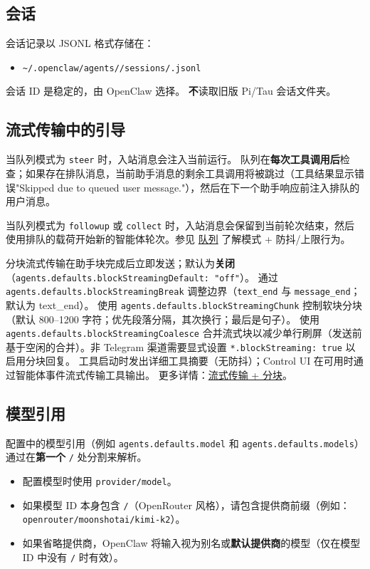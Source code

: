 \subsection{会话}


会话记录以 JSONL 格式存储在：

\begin{itemize}
  \item \texttt{\textasciitilde{}/.openclaw/agents//sessions/.jsonl}
\end{itemize}


会话 ID 是稳定的，由 OpenClaw 选择。
\textbf{不}读取旧版 Pi/Tau 会话文件夹。

\subsection{流式传输中的引导}


当队列模式为 \texttt{steer} 时，入站消息会注入当前运行。
队列在\textbf{每次工具调用后}检查；如果存在排队消息，当前助手消息的剩余工具调用将被跳过（工具结果显示错误"Skipped due to queued user message."），然后在下一个助手响应前注入排队的用户消息。

当队列模式为 \texttt{followup} 或 \texttt{collect} 时，入站消息会保留到当前轮次结束，然后使用排队的载荷开始新的智能体轮次。参见 \href{/concepts/queue}{队列} 了解模式 + 防抖/上限行为。

分块流式传输在助手块完成后立即发送；默认为\textbf{关闭}（\texttt{agents.defaults.blockStreamingDefault: "off"}）。
通过 \texttt{agents.defaults.blockStreamingBreak} 调整边界（\texttt{text\_end} 与 \texttt{message\_end}；默认为 text\_end）。
使用 \texttt{agents.defaults.blockStreamingChunk} 控制软块分块（默认 800–1200 字符；优先段落分隔，其次换行；最后是句子）。
使用 \texttt{agents.defaults.blockStreamingCoalesce} 合并流式块以减少单行刷屏（发送前基于空闲的合并）。非 Telegram 渠道需要显式设置 \texttt{*.blockStreaming: true} 以启用分块回复。
工具启动时发出详细工具摘要（无防抖）；Control UI 在可用时通过智能体事件流式传输工具输出。
更多详情：\href{/concepts/streaming}{流式传输 + 分块}。

\subsection{模型引用}


配置中的模型引用（例如 \texttt{agents.defaults.model} 和 \texttt{agents.defaults.models}）通过在\textbf{第一个} \texttt{/} 处分割来解析。

\begin{itemize}
  \item 配置模型时使用 \texttt{provider/model}。
  \item 如果模型 ID 本身包含 \texttt{/}（OpenRouter 风格），请包含提供商前缀（例如：\texttt{openrouter/moonshotai/kimi-k2}）。
  \item 如果省略提供商，OpenClaw 将输入视为别名或\textbf{默认提供商}的模型（仅在模型 ID 中没有 \texttt{/} 时有效）。
\end{itemize}


